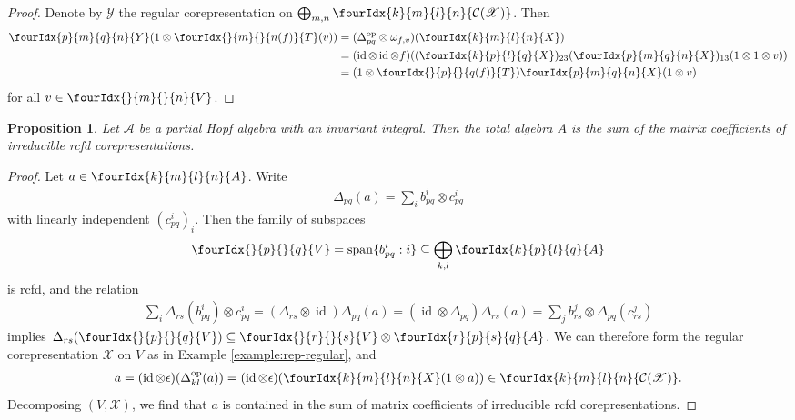 \documentclass[11pt]{article}
\DeclareMathOperator{\id}{id}
\DeclareMathOperator{\op}{\mathrm{op}}
\newcommand{\Gr}[5]{\fourIdx{#2}{#4}{#3}{#5}{#1}}%
\newcommand{\Gru}[3]{\Gr{#1}{}{}{#2}{#3}}
\newtheorem{Prop}[Theorem]{Proposition}
\theoremstyle{definition}
\numberwithin{equation}{section}
\begin{document}
\begin{proof}
  Denote by $\mathscr{Y}$ the regular corepresentation on
  $\bigoplus_{m,n } \Gr{\mathcal{C}(\mathscr{X})}{k}{l}{m}{n}$. Then
  \begin{align*}
    \label{eq:1}
 \Gr{Y}{p}{q}{m}{n}    (1\otimes \Gr{T}{}{}{m}{n(f)}(v)) &= 
(\Delta^{\op}_{pq} \otimes \omega_{f,v})( \Gr{X}{k}{l}{m}{n}) 
\\ & = (\id \otimes \id \otimes
f)((\Gr{X}{k}{l}{p}{q})_{23}(\Gr{X}{p}{q}{m}{n})_{13}(1 \otimes 1
 \otimes v)) \\ &=(1 \otimes \Gr{T}{}{}{p}{q(f)})\Gr{X}{p}{q}{m}{n}(1 \otimes v)
  \end{align*}
for all $v \in \Gru{V}{m}{n}$.
\end{proof}
\begin{Prop} \label{prop:rep-weak-pw} Let $\mathscr{A}$ be a partial
  Hopf algebra with an invariant integral. Then the total algebra $A$ is the sum
  of the matrix coefficients of irreducible rcfd corepresentations.
\end{Prop}
\begin{proof} 
  Let $a \in \Gr{A}{k}{l}{m}{n}$. Write
  \begin{align*}
    \Delta_{pq}(a)=\sum_{i} b_{pq}^{i} \otimes c^{i}_{pq}
  \end{align*}
 with linearly independent
  $(c_{pq}^{i})_{i}$. Then the family of subspaces
  \begin{align*}
    \Gru{V}{p}{q} = \mathrm{span}\{b_{pq}^{i} : i \}\subseteq \bigoplus_{k,l}
  \Gr{A}{k}{l}{p}{q}
  \end{align*}
is rcfd, and the relation
  \begin{align*}
 \sum_{i}
    \Delta_{rs}(b^{i}_{pq}) \otimes c^{i}_{pq} =
    (\Delta_{rs} \otimes \id)\Delta_{pq}(a) = (\id \otimes
    \Delta_{pq}) \Delta_{rs}(a) = \sum_{j} b^{j}_{rs} \otimes
    \Delta_{pq}(c^{j}_{rs})
  \end{align*}
  implies $\Delta_{rs}(\Gru{V}{p}{q}) \subseteq \Gru{V}{r}{s} \otimes
  \Gr{A}{r}{s}{p}{q}$.  We can therefore form the regular
  corepresentation $\mathscr{X}$ on $V$ as in Example \ref{example:rep-regular}, and
  \begin{align*}
    a = (\id \otimes \epsilon)(\Delta^{\op}_{kl}(a)) =
    (\id \otimes \epsilon)(\Gr{X}{k}{l}{m}{n}(1 \otimes a)) \in
    \Gr{\mathcal{C}(\mathscr{X})}{k}{l}{m}{n}.
  \end{align*}
  Decomposing $(V,\mathscr{X})$, we find that
  $a$ is contained in the sum of matrix coefficients of irreducible
rcfd  corepresentations.
\end{proof}
\end{document}
